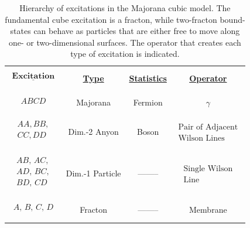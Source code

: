 \documentclass[aps,twocolumn,preprintnumbers,floatfix,showpacs,prx]{revtex4-1}
\begin{document}
 \begin{table}
\begin{tabular}{|c|c|c|c|}
  \hline
  $\begin{array}{c}\\\mathbf{\underline{Excitation}}\\ \\\end{array}$ & \underline{\bf Type} & \underline{\bf Statistics} & \underline{\bf Operator}\\
    \hhline{|=|=|=|=|}
    $\begin{array}{c} \\ ABCD \\ \\\end{array}$ & Majorana & Fermion & $\gamma$\\ 
      \hline
      $\begin{array}{c} \\ AA, BB, \\CC, DD\\ \\\end{array}$ & Dim.-2 Anyon & Boson & $\begin{array}{c}\text{Pair of Adjacent}\\ \text{Wilson Lines}\end{array}$ \\
      \hline
      $\begin{array}{c} \\ AB,\, AC,\\ AD,\, 
      BC,\\ BD,\, CD \\ \\\end{array}$ & Dim.-1 Particle & -------- & $\begin{array}{c}\text{Single Wilson}\\ \text{Line}\end{array}$ \\
      \hline
      $\begin{array}{c}\\ A,\,B,\,C,\,D \\ \\ \end{array}$ & Fracton & -------- & Membrane\\
      \hline
 \end{tabular}
 \caption{Hierarchy of excitations in the Majorana cubic model. 
 The fundamental cube excitation is a fracton,
 while two-fracton bound-states can behave as particles that are either free to move along one- or two-dimensional surfaces.
 The operator that creates each type of excitation is indicated.}
 \label{tab:Hierarchy}
 \end{table}
 
\end{document}
